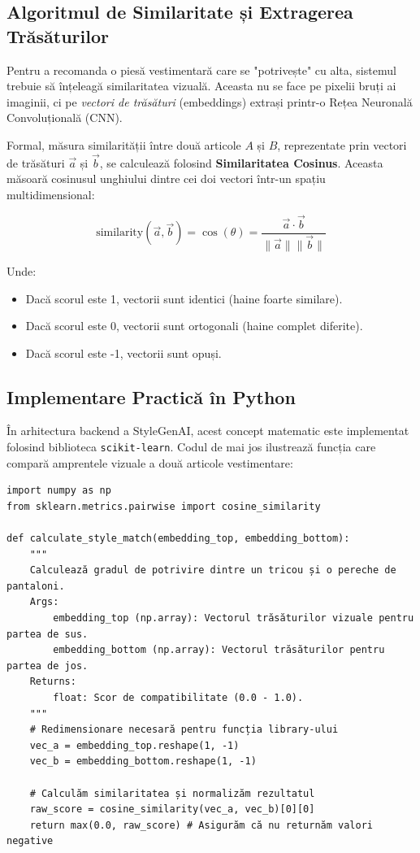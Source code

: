 \subsection{Algoritmul de Similaritate și Extragerea Trăsăturilor}
Pentru a recomanda o piesă vestimentară care se "potrivește" cu alta, sistemul trebuie să înțeleagă similaritatea vizuală. Aceasta nu se face pe pixelii bruți ai imaginii, ci pe \textit{vectori de trăsături} (embeddings) extrași printr-o Rețea Neuronală Convoluțională (CNN).

Formal, măsura similarității între două articole $A$ și $B$, reprezentate prin vectori de trăsături $\vec{a}$ și $\vec{b}$, se calculează folosind \textbf{Similaritatea Cosinus}. Aceasta măsoară cosinusul unghiului dintre cei doi vectori într-un spațiu multidimensional:

\begin{equation}
\text{similarity}(\vec{a}, \vec{b}) = \cos(\theta) = \frac{\vec{a} \cdot \vec{b}}{\|\vec{a}\| \|\vec{b}\|}
\end{equation}

Unde:
\begin{itemize}
    \item Dacă scorul este 1, vectorii sunt identici (haine foarte similare).
    \item Dacă scorul este 0, vectorii sunt ortogonali (haine complet diferite).
    \item Dacă scorul este -1, vectorii sunt opuși.
\end{itemize}

\subsection{Implementare Practică în Python}
În arhitectura backend a StyleGenAI, acest concept matematic este implementat folosind biblioteca \texttt{scikit-learn}. Codul de mai jos ilustrează funcția care compară amprentele vizuale a două articole vestimentare:

\begin{verbatim}
import numpy as np
from sklearn.metrics.pairwise import cosine_similarity

def calculate_style_match(embedding_top, embedding_bottom):
    """
    Calculează gradul de potrivire dintre un tricou și o pereche de pantaloni.
    Args:
        embedding_top (np.array): Vectorul trăsăturilor vizuale pentru partea de sus.
        embedding_bottom (np.array): Vectorul trăsăturilor pentru partea de jos.
    Returns:
        float: Scor de compatibilitate (0.0 - 1.0).
    """
    # Redimensionare necesară pentru funcția library-ului
    vec_a = embedding_top.reshape(1, -1)
    vec_b = embedding_bottom.reshape(1, -1)
    
    # Calculăm similaritatea și normalizăm rezultatul
    raw_score = cosine_similarity(vec_a, vec_b)[0][0]
    return max(0.0, raw_score) # Asigurăm că nu returnăm valori negative
\end{verbatim}

